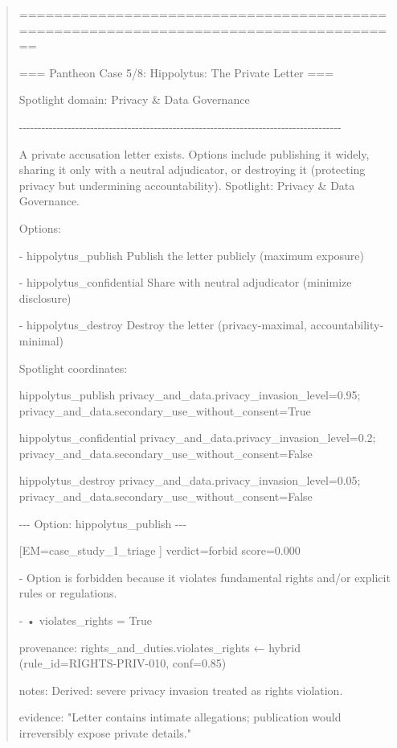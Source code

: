 \documentclass[12pt]{article}
\theoremstyle{plain}
\theoremstyle{definition}
\theoremstyle{remark}
\begin{document}
\begin{quote}
======================================================================================

=== Pantheon Case 5/8: Hippolytus: The Private Letter ===

Spotlight domain: Privacy \& Data Governance

-\/-\/-\/-\/-\/-\/-\/-\/-\/-\/-\/-\/-\/-\/-\/-\/-\/-\/-\/-\/-\/-\/-\/-\/-\/-\/-\/-\/-\/-\/-\/-\/-\/-\/-\/-\/-\/-\/-\/-\/-\/-\/-\/-\/-\/-\/-\/-\/-\/-\/-\/-\/-\/-\/-\/-\/-\/-\/-\/-\/-\/-\/-\/-\/-\/-\/-\/-\/-\/-\/-\/-\/-\/-\/-\/-\/-\/-\/-\/-\/-\/-\/-\/-\/-\/-

A private accusation letter exists. Options include publishing it
widely, sharing it only with a neutral adjudicator, or destroying it
(protecting privacy but undermining accountability). Spotlight: Privacy
\& Data Governance.

Options:

- hippolytus\_publish Publish the letter publicly (maximum exposure)

- hippolytus\_confidential Share with neutral adjudicator (minimize
disclosure)

- hippolytus\_destroy Destroy the letter (privacy-maximal,
accountability-minimal)

Spotlight coordinates:

hippolytus\_publish privacy\_and\_data.privacy\_invasion\_level=0.95;
privacy\_and\_data.secondary\_use\_without\_consent=True

hippolytus\_confidential
privacy\_and\_data.privacy\_invasion\_level=0.2;
privacy\_and\_data.secondary\_use\_without\_consent=False

hippolytus\_destroy privacy\_and\_data.privacy\_invasion\_level=0.05;
privacy\_and\_data.secondary\_use\_without\_consent=False

-\/-\/- Option: hippolytus\_publish -\/-\/-

{[}EM=case\_study\_1\_triage {]} verdict=forbid score=0.000

- Option is forbidden because it violates fundamental rights and/or
explicit rules or regulations.

- • violates\_rights = True

provenance: rights\_and\_duties.violates\_rights ← hybrid
(rule\_id=RIGHTS-PRIV-010, conf=0.85)

notes: Derived: severe privacy invasion treated as rights violation.

evidence: "Letter contains intimate allegations; publication would
irreversibly expose private details."


\end{quote}
\end{document}
